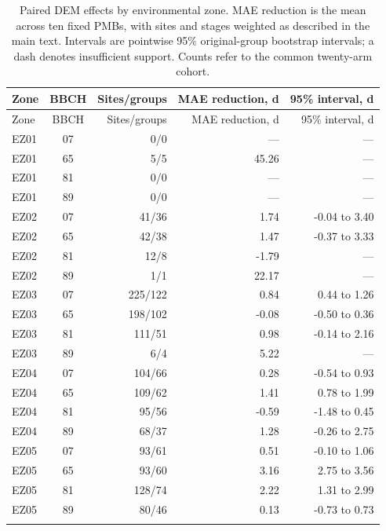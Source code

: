 \begin{longtable}{@{}lcrrr@{}}
\caption{Paired DEM effects by environmental zone. MAE reduction is the mean across ten fixed PMBs, with sites and stages weighted as described in the main text. Intervals are pointwise 95\% original-group bootstrap intervals; a dash denotes insufficient support. Counts refer to the common twenty-arm cohort.}\label{tab:dem_zone_effects}\\
\toprule
Zone & BBCH & Sites/groups & MAE reduction, d & 95\% interval, d \\
\midrule\endfirsthead
\toprule Zone & BBCH & Sites/groups & MAE reduction, d & 95\% interval, d \\ \midrule\endhead
EZ01 & 07 & 0/0 & --- & --- \\
EZ01 & 65 & 5/5 & 45.26 & --- \\
EZ01 & 81 & 0/0 & --- & --- \\
EZ01 & 89 & 0/0 & --- & --- \\
\addlinespace
EZ02 & 07 & 41/36 & 1.74 & -0.04 to 3.40 \\
EZ02 & 65 & 42/38 & 1.47 & -0.37 to 3.33 \\
EZ02 & 81 & 12/8 & -1.79 & --- \\
EZ02 & 89 & 1/1 & 22.17 & --- \\
\addlinespace
EZ03 & 07 & 225/122 & 0.84 & 0.44 to 1.26 \\
EZ03 & 65 & 198/102 & -0.08 & -0.50 to 0.36 \\
EZ03 & 81 & 111/51 & 0.98 & -0.14 to 2.16 \\
EZ03 & 89 & 6/4 & 5.22 & --- \\
\addlinespace
EZ04 & 07 & 104/66 & 0.28 & -0.54 to 0.93 \\
EZ04 & 65 & 109/62 & 1.41 & 0.78 to 1.99 \\
EZ04 & 81 & 95/56 & -0.59 & -1.48 to 0.45 \\
EZ04 & 89 & 68/37 & 1.28 & -0.26 to 2.75 \\
\addlinespace
EZ05 & 07 & 93/61 & 0.51 & -0.10 to 1.06 \\
EZ05 & 65 & 93/60 & 3.16 & 2.75 to 3.56 \\
EZ05 & 81 & 128/74 & 2.22 & 1.31 to 2.99 \\
EZ05 & 89 & 80/46 & 0.13 & -0.73 to 0.73 \\
\addlinespace
\bottomrule
\end{longtable}

